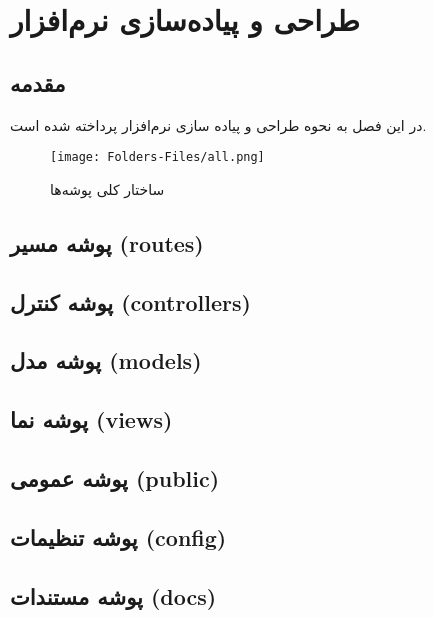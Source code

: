 \chapter{طراحی و پیاده‌سازی نرم‌افزار}
\clearpage

\section*{مقدمه}
در این فصل به نحوه طراحی و پیاده سازی نرم‌افزار پرداخته شده است.
\begin{figure}[H]
	\texttt{[image: Folders-Files/all.png]}
	\centering
	\caption{ساختار کلی پوشه‌ها}
	\label{fig:folder-main}
\end{figure}

\section{پوشه مسیر (routes)}


\section{پوشه کنترل (controllers)}


\section{پوشه مدل (models)}


\section{پوشه نما (views)}


\section{پوشه عمومی‌ (public)}


\section{پوشه تنظیمات (config)}


\section{پوشه مستندات (docs)}


